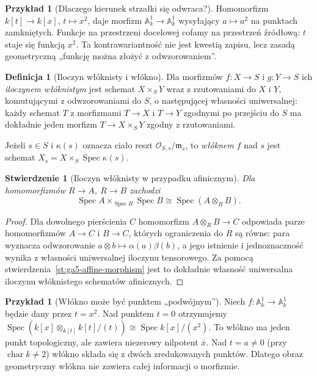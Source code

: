 \documentclass[11pt,a4paper,openany]{report}
\numberwithin{equation}{section}
\theoremstyle{plain}
\newtheorem{stwierdzenie}[twierdzenie]{Stwierdzenie}
\theoremstyle{definition}
\newtheorem{definicja}[twierdzenie]{Definicja}
\newtheorem{przyklad}[twierdzenie]{Przykład}
\theoremstyle{remark}
\newcommand{\A}{\mathbb A}
\newcommand{\Spec}{\operatorname{Spec}}
\begin{document}
\begin{przyklad}[Dlaczego kierunek strzałki się odwraca?]
Homomorfizm $k[t]\to k[x]$, $t\mapsto x^2$, daje morfizm
$\A^1_k\to\A^1_k$ wysyłający $a\mapsto a^2$ na punktach
zamkniętych. Funkcje na przestrzeni docelowej cofamy na przestrzeń
źródłową: $t$ staje się funkcją $x^2$.
Ta kontrawariantność nie jest kwestią zapisu, lecz zasadą
geometryczną „funkcję można złożyć z odwzorowaniem”.
\end{przyklad}

\begin{definicja}[Iloczyn włóknisty i włókno]
\label{def:ga5-fibreproduct}
Dla morfizmów $f:X\to S$ i $g:Y\to S$ ich \emph{iloczynem
włóknistym} jest schemat $X\times_S Y$ wraz z rzutowaniami do $X$
i $Y$, komutującymi z odwzorowaniami do $S$, o następującej
własności uniwersalnej: każdy schemat $T$ z morfizmami $T\to X$
i $T\to Y$ zgodnymi po przejściu do $S$ ma dokładnie jeden
morfizm $T\to X\times_S Y$ zgodny z rzutowaniami.

Jeżeli $s\in S$ i $\kappa(s)$ oznacza ciało reszt
$\mathcal O_{S,s}/\mathfrak m_s$, to \emph{włóknem} $f$ nad $s$
jest schemat $X_s=X\times_S\Spec\kappa(s)$.
\end{definicja}

\begin{stwierdzenie}[Iloczyn włóknisty w przypadku afinicznym]
\label{st:ga5-tensor-fibre}
Dla homomorfizmów $R\to A$, $R\to B$ zachodzi
\[
 \Spec A\times_{\Spec R}\Spec B\cong\Spec(A\otimes_R B).
\]
\end{stwierdzenie}
\begin{proof}
Dla dowolnego pierścienia $C$ homomorfizm
$A\otimes_R B\to C$ odpowiada parze homomorfizmów
$A\to C$ i $B\to C$, których ograniczenia do $R$ są równe:
para wyznacza odwzorowanie $a\otimes b\mapsto\alpha(a)\beta(b)$,
a jego istnienie i jednoznaczność wynika z własności uniwersalnej
iloczynu tensorowego. Za pomocą stwierdzenia~\ref{st:ga5-affine-morphism}
jest to dokładnie własność uniwersalna iloczynu włóknistego
schematów afinicznych.
\end{proof}

\begin{przyklad}[Włókno może być punktem „podwójnym”]
\label{prz:ga5-double-fibre}
Niech $f:\A^1_k\to\A^1_k$ będzie dany przez $t=x^2$.
Nad punktem $t=0$ otrzymujemy
$\Spec(k[x]\otimes_{k[t]}k[t]/(t))\cong\Spec k[x]/(x^2)$.
To włókno ma jeden punkt topologiczny, ale zawiera niezerowy
nilpotent $\overline x$. Nad $t=a\ne0$ (przy $\operatorname{char}k\ne2$)
włókno składa się z dwóch zredukowanych punktów.
Dlatego obraz geometryczny włókna nie zawiera całej informacji
o morfizmie.
\end{przyklad}
\end{document}
